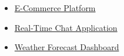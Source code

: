 \begin{itemize}[itemsep=1pt]
\item{\href{https://github.com/}{E-Commerce Platform}}
\item{\href{https://github.com/}{Real-Time Chat Application}}
\item{\href{https://github.com/}{Weather Forecast Dashboard}}
\end{itemize}